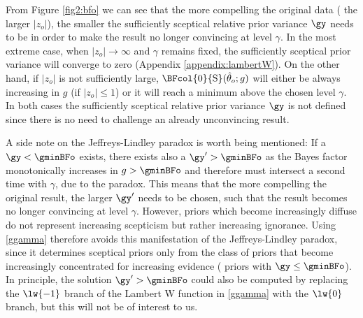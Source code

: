 From Figure \ref{fig2:bfo} we can see that the more compelling the original data
(\ie{} the larger $|z_o|$), the smaller the sufficiently sceptical relative prior
variance $\gy$ needs to be in order to make the result no longer convincing at
level $\gamma$. In the most extreme case, when $|z_{o}| \to \infty$ and $\gamma$
remains fixed, the sufficiently sceptical prior variance will converge to
zero (Appendix \ref{appendix:lambertW}). On the other hand, if $|z_o|$ is not
sufficiently large, $\BFcol{0}{\mathrm{S}}(\hat{\theta}_o; g)$ will either be
always increasing in $g$ (if $|z_o| \leq 1$) or it will reach a minimum above
the chosen level $\gamma$. In both cases the sufficiently sceptical relative
prior variance $\gy$ is not defined since there is no need to challenge an
already unconvincing result.

A side note on the Jeffreys-Lindley paradox is worth being mentioned: If a
$\gy < \gminBFo$ exists, there exists also a $\gy^\prime > \gminBFo$ as the
Bayes factor monotonically increases in $g > \gminBFo$ and therefore must
intersect a second time with $\gamma$, due to the paradox. This means that the
more compelling the original result, the larger $\gy^\prime$ needs to be chosen,
such that the result becomes no longer convincing at level $\gamma$. However,
priors which become increasingly diffuse do not represent increasing scepticism
but rather increasing ignorance. Using \eqref{ggamma} therefore avoids this
manifestation of the Jeffreys-Lindley paradox, since it determines sceptical
priors only from the class of priors that become increasingly concentrated for
increasing evidence (\ie{} priors with $\gy \leq \gminBFo$). In principle, the
solution $\gy^\prime > \gminBFo $ could also be computed by replacing the
$\lw{-1}$ branch of the Lambert W function in \eqref{ggamma} with the $\lw{0}$
branch, but this will not be of interest to us.



